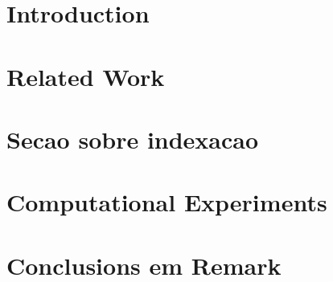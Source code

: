 \documentclass[preprint,12pt]{elsarticle}
\begin{document}
\section{Introduction}

\section{Related Work}

\section{Secao sobre indexacao}

\section{Computational Experiments}

\section{Conclusions em Remark}

%

\cite{Karp-1972}


%

\end{document}
